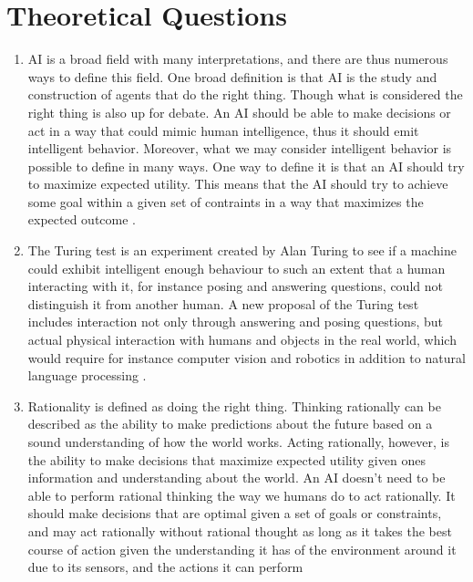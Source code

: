 \section{Theoretical Questions}

\begin{enumerate}
  \item 
    AI is a broad field with many interpretations, and there are thus 
    numerous ways to define this field. One broad definition is that AI is the 
    study and construction of agents that do the right thing. Though what is 
    considered the right thing is also up for debate. An AI should be able to 
    make decisions or act in a way that could mimic human intelligence, thus it 
    should emit intelligent behavior. Moreover, what we may consider intelligent
    behavior is possible to define in many ways. One way to define it is that an
    AI should try to maximize expected utility. This means that the AI should 
    try to achieve some goal within a given set of contraints in a way that 
    maximizes the expected outcome \autocite[pp.~7--22]{russell2021artificial}.
  \item 
    The Turing test is an experiment created by Alan Turing to see if a 
    machine could exhibit intelligent enough behaviour to such an extent that
    a human interacting with it, for instance posing and answering questions,
    could not distinguish it from another human. A new proposal of the Turing
    test includes interaction not only through answering and posing questions,
    but actual physical interaction with humans and objects in the real world,
    which would require for instance computer vision and robotics in addition
    to natural language processing \autocite[p.~23]{russell2021artificial}.
  \item 
    Rationality is defined as doing the right thing. Thinking rationally can be 
    described as the ability to make predictions about the future based on a 
    sound understanding of how the world works. Acting rationally, however, is 
    the ability to make decisions that maximize expected utility given ones
    information and understanding about the world. An AI doesn't need to be able 
    to perform rational thinking the way we humans do to act rationally. It 
    should make decisions that are optimal given a set of goals or constraints, 
    and may act rationally without rational thought as long as it takes the best
    course of action given the understanding it has of the environment around it
    due to its sensors, and the actions it can perform 

\end{enumerate}
